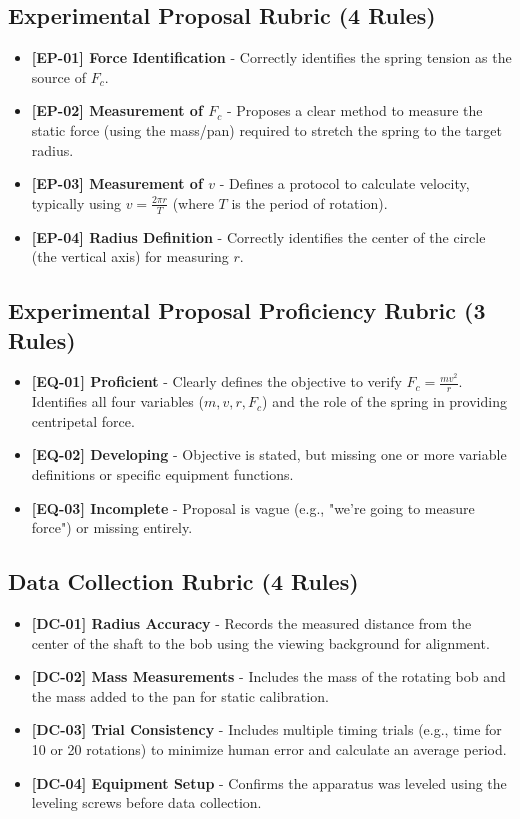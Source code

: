 \documentclass{article}
\begin{document}
\subsection*{Experimental Proposal Rubric (4 Rules)}
\begin{itemize}
\item \textbf{ [EP-01] Force Identification } - Correctly identifies the spring tension as the source of $ F_c $.
\item \textbf{ [EP-02] Measurement of $ F_c $ } - Proposes a clear method to measure the static force (using the mass/pan) required to stretch the spring to the target radius.
\item \textbf{ [EP-03] Measurement of $ v $ } - Defines a protocol to calculate velocity, typically using $ v = \frac { 2 \pi r }{ T } $ (where $ T $ is the period of rotation).
\item \textbf{ [EP-04] Radius Definition } - Correctly identifies the center of the circle (the vertical axis) for measuring $ r $.
\end{itemize}

\subsection*{Experimental Proposal Proficiency Rubric (3 Rules)}
\begin{itemize}
\item \textbf{ [EQ-01] Proficient } - Clearly defines the objective to verify $ F_c = \frac { m v^2 } { r } $. Identifies all four variables ($ m, v, r, F_c $) and the role of the spring in providing centripetal force.
\item \textbf{ [EQ-02] Developing } - Objective is stated, but missing one or more variable definitions or specific equipment functions.
\item \textbf{ [EQ-03] Incomplete } - Proposal is vague (e.g., "we're going to measure force") or missing entirely.
\end{itemize}

\subsection*{Data Collection Rubric (4 Rules)}
\begin{itemize}
\item \textbf{ [DC-01] Radius Accuracy } - Records the measured distance from the center of the shaft to the bob using the viewing background for alignment.
\item \textbf{ [DC-02] Mass Measurements } - Includes the mass of the rotating bob and the mass added to the pan for static calibration.
\item \textbf{ [DC-03] Trial Consistency } - Includes multiple timing trials (e.g., time for 10 or 20 rotations) to minimize human error and calculate an average period. 
\item \textbf{ [DC-04] Equipment Setup } - Confirms the apparatus was leveled using the leveling screws before data collection.
\end{itemize}
\end{document}
